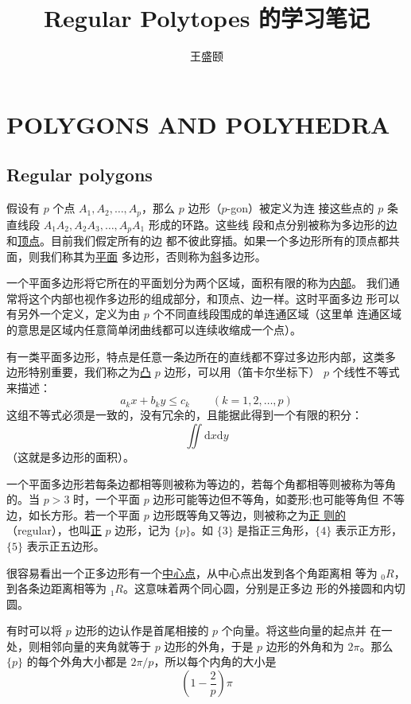 \documentclass[cs4size,a4paper,adobefonts,openany]{ctexbook}
\newcommand{\pname}[1]{\underline{#1}}
\numberwithin{equation}{section}
\begin{document}
\title{\bfseries Regular Polytopes 的学习笔记}
\author{王盛颐}
\date{}
\maketitle
\setcounter{page}{1}
\chapter{POLYGONS AND POLYHEDRA}
\section{Regular polygons}
假设有 $p$ 个点 $A_1,A_2,\dots,A_p$，那么 $p$ 边形（$p$-gon）被定义为连
接这些点的 $p$ 条直线段 $A_1A_2,A_2A_3,\dots,A_pA_1$ 形成的环路。这些线
段和点分别被称为多边形的\pname{边}和\pname{顶点}。目前我们假定所有的边
都不彼此穿插。如果一个多边形所有的顶点都共面，则我们称其为\pname{平面}
多边形，否则称为\pname{斜}多边形。

一个平面多边形将它所在的平面划分为两个区域，面积有限的称为\pname{内部}。
我们通常将这个内部也视作多边形的组成部分，和顶点、边一样。这时平面多边
形可以有另外一个定义，定义为由 $p$ 个不同直线段围成的单连通区域（这里单
  连通区域的意思是区域内任意简单闭曲线都可以连续收缩成一个点）。

有一类平面多边形，特点是任意一条边所在的直线都不穿过多边形内部，这类多
边形特别重要，我们称之为\pname{凸} $p$ 边形，可以用（笛卡尔坐标下）
$p$ 个线性不等式来描述：
\[
a_kx+b_ky \leq c_k\qquad (k=1,2,\dots,p)
\]
这组不等式必须是一致的，没有冗余的，且能据此得到一个有限的积分：
\[
\iint\text{d}x\text{d}y
\]
（这就是多边形的面积）。

一个平面多边形若每条边都相等则被称为等边的，若每个角都相等则被称为等角
的。当 $p>3$ 时，一个平面 $p$ 边形可能等边但不等角，如菱形;也可能等角但
不等边，如长方形。若一个平面 $p$ 边形既等角又等边，则被称之为\pname{正
  则的} （regular），也叫\pname{正} $p$ 边形，记为 $\{p\}$。如 $\{3\}$
是指正三角形，$\{4\}$ 表示正方形，$\{5\}$ 表示正五边形。

很容易看出一个正多边形有一个\pname{中心点}，从中心点出发到各个角距离相
等为 ${_0R}$，到各条边距离相等为 ${_1R}$。这意味着两个同心圆，分别是正多边
形的外接圆和内切圆。

有时可以将 $p$ 边形的边认作是首尾相接的 $p$ 个向量。将这些向量的起点并
在一处，则相邻向量的夹角就等于 $p$ 边形的外角，于是 $p$ 边形的外角和为
$2\pi$。那么 $\{p\}$ 的每个外角大小都是 $2\pi/p$，所以每个内角的大小是
\begin{equation}
  (1-\frac{2}{p})\pi
\end{equation}
\end{document}
